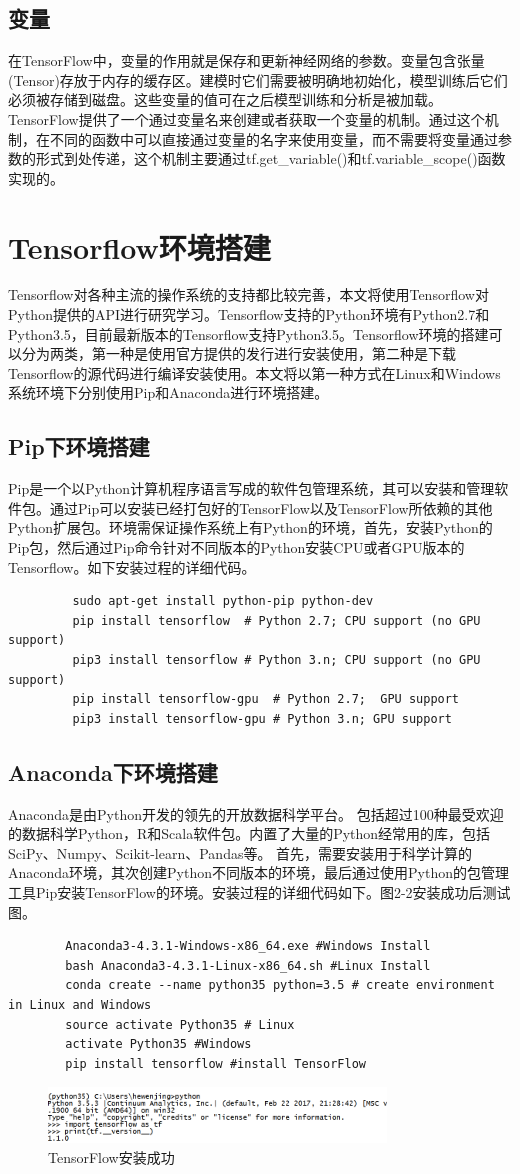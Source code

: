		\subsection{变量}
		在TensorFlow中，变量的作用就是保存和更新神经网络的参数。变量包含张量 (Tensor)存放于内存的缓存区。建模时它们需要被明确地初始化，模型训练后它们必须被存储到磁盘。这些变量的值可在之后模型训练和分析是被加载。 TensorFlow提供了一个通过变量名来创建或者获取一个变量的机制。通过这个机制，在不同的函数中可以直接通过变量的名字来使用变量，而不需要将变量通过参数的形式到处传递，这个机制主要通过tf.get\_variable()和tf.variable\_scope()函数实现的。
	\section{Tensorflow环境搭建}
	Tensorflow对各种主流的操作系统的支持都比较完善，本文将使用Tensorflow对Python提供的API进行研究学习。Tensorflow支持的Python环境有Python2.7和Python3.5，目前最新版本的Tensorflow支持Python3.5。Tensorflow环境的搭建可以分为两类，第一种是使用官方提供的发行进行安装使用，第二种是下载Tensorflow的源代码进行编译安装使用。本文将以第一种方式在Linux和Windows系统环境下分别使用Pip和Anaconda进行环境搭建。
		\subsection{Pip下环境搭建}
		Pip是一个以Python计算机程序语言写成的软件包管理系统，其可以安装和管理软件包。通过Pip可以安装已经打包好的TensorFlow以及TensorFlow所依赖的其他Python扩展包。环境需保证操作系统上有Python的环境，首先，安装Python的Pip包，然后通过Pip命令针对不同版本的Python安装CPU或者GPU版本的Tensorflow。如下安装过程的详细代码。
		\begin{lstlisting}
		 sudo apt-get install python-pip python-dev
		 pip install tensorflow  # Python 2.7; CPU support (no GPU support)
		 pip3 install tensorflow # Python 3.n; CPU support (no GPU support)
		 pip install tensorflow-gpu  # Python 2.7;  GPU support
		 pip3 install tensorflow-gpu # Python 3.n; GPU support
		\end{lstlisting}
		\subsection{Anaconda下环境搭建}
		Anaconda是由Python开发的领先的开放数据科学平台。 包括超过100种最受欢迎的数据科学Python，R和Scala软件包。内置了大量的Python经常用的库，包括SciPy、Numpy、Scikit-learn、Pandas等。 首先，需要安装用于科学计算的Anaconda环境，其次创建Python不同版本的环境，最后通过使用Python的包管理工具Pip安装TensorFlow的环境。安装过程的详细代码如下。图2-2安装成功后测试图。
		\begin{lstlisting}
		Anaconda3-4.3.1-Windows-x86_64.exe #Windows Install
		bash Anaconda3-4.3.1-Linux-x86_64.sh #Linux Install
		conda create --name python35 python=3.5 # create environment in Linux and Windows
		source activate Python35 # Linux
		activate Python35 #Windows
		pip install tensorflow #install TensorFlow
		\end{lstlisting}
		
		\begin{figure}[!ht]
			\centering
			\includegraphics[width=0.8\textwidth]{figures/2-2}
			\caption{TensorFlow安装成功}
			\label{fig:2-2}
		\end{figure}